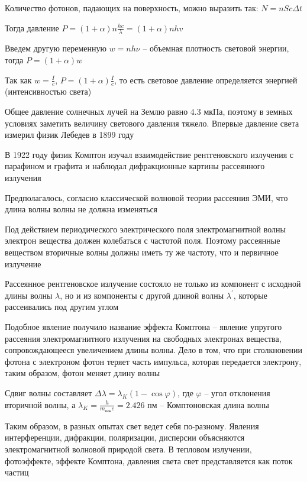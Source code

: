 Количество фотонов, падающих на поверхность, можно выразить так: $N = n S c \Delta t$

Тогда давление $P = (1 + \alpha) n \frac{h c}{\lambda} = (1 + \alpha) n h v$

Введем другую переменную $w = n h \nu$ -- объемная плотность световой энергии, тогда $P = (1 + \alpha) w$

Так как $w = \frac{I}{c}$, $P = (1 + \alpha) \frac{I}{c}$, то есть световое давление определяется энергией (интенсивностью света)

Общее давление солнечных лучей на Землю равно $4.3$ мкПа, поэтому в земных условиях заметить величину светового давления тяжело. Впервые давление света измерил физик Лебедев в 1899 году

\mediumvspace

В 1922 году физик Комптон изучал взаимодействие рентгеновского излучения с парафином и графита и наблюдал дифракционные картины рассеянного излучения

Предполагалось, согласно классической волновой теории рассеяния ЭМИ, что длина волны волны не должна изменяться

Под действием периодического электрического поля электромагнитной волны электрон вещества должен колебаться с частотой поля. Поэтому рассеянные веществом вторичные волны должны иметь ту же частоту, что и первичное излучение


Рассеянное рентгеновское излучение состояло не только из компонент с исходной длины волны $\lambda$, но и из компоненты с другой длиной волны $\lambda^\prime$, которые рассеивались под другим углом

Подобное явление получило название эффекта Комптона -- явление упругого рассеяния электромагнитного излучения на свободных электронах вещества, сопровождающееся увеличением длины волны. Дело в том, что при столкновении фотона с электроном фотон теряет часть импульса, которая передается электрону, таким образом, фотон меняет длину волны

Сдвиг волны составляет $\Delta \lambda = \lambda_K (1 - \cos\varphi)$, где $\varphi$ -- угол отклонения вторичной волны, а $\lambda_K = \frac{h}{m_{\text{пок}} c} = 2.426$ пм -- Комптоновская длина волны

\mediumvspace

Таким образом, в разных опытах свет ведет себя по-разному. Явления интерференции, дифракции, поляризации, дисперсии объясняются электромагнитной волновой природой света. В тепловом излучении, фотоэффекте, эффекте Комптона, давления света свет представляется как поток частиц

